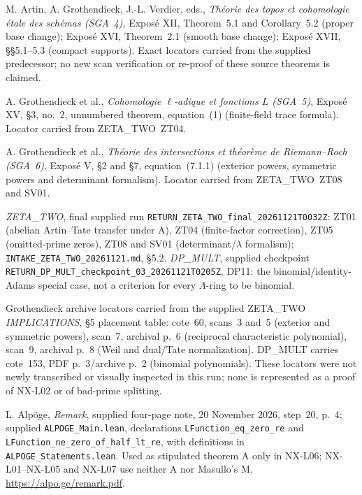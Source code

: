  M. Artin, A. Grothendieck, J.-L. Verdier, eds.,
\emph{Th\'eorie des topos et cohomologie \'etale des sch\'emas (SGA~4)},
Expos\'e XII, Theorem~5.1 and Corollary~5.2 (proper base change);
Expos\'e XVI, Theorem~2.1 (smooth base change);
Expos\'e XVII, \S\S5.1--5.3 (compact supports).
Exact locators carried from the supplied predecessor; no new scan
verification or re-proof of these source theorems is claimed.

 A. Grothendieck et al.,
\emph{Cohomologie $\ell$-adique et fonctions $L$ (SGA~5)},
Expos\'e XV, \S3, no.~2, unnumbered theorem, equation~(1)
(finite-field trace formula). Locator carried from ZETA\_TWO~ZT04.

 A. Grothendieck et al.,
\emph{Th\'eorie des intersections et th\'eor\`eme de Riemann--Roch (SGA~6)},
Expos\'e V, \S2 and \S7, equation~(7.1.1)
(exterior powers, symmetric powers and determinant formalism).
Locator carried from ZETA\_TWO~ZT08 and SV01.

 \emph{ZETA\_TWO}, final supplied run
\texttt{RETURN\_ZETA\_TWO\_final\_20261121T0032Z}:
ZT01 (abelian Artin--Tate transfer under A), ZT04 (finite-factor correction),
ZT05 (omitted-prime zeros), ZT08 and SV01 (determinant/$\lambda$ formalism);
\texttt{INTAKE\_ZETA\_TWO\_20261121.md}, \S5.2.
\emph{DP\_MULT}, supplied checkpoint
\texttt{RETURN\_DP\_MULT\_checkpoint\_03\_20261121T0205Z}, DP11:
the binomial/identity-Adams special case, not a criterion for every
$\Lambda$-ring to be binomial.

 Grothendieck archive locators carried from the supplied
ZETA\_TWO \emph{IMPLICATIONS}, \S5 placement table: cote~60,
scans~3 and~5 (exterior and symmetric powers), scan~7, archival p.~6
(reciprocal characteristic polynomial), scan~9, archival p.~8
(Weil and dual/Tate normalization). DP\_MULT carries cote~153,
PDF p.~3/archive p.~2 (binomial polynomials). These locators were not
newly transcribed or visually inspected in this run; none is represented
as a proof of NX-L02 or of bad-prime splitting.

 L. Alp\"oge, \emph{Remark}, supplied four-page note,
20 November 2026, step~20, p.~4; supplied
\texttt{ALPOGE\_Main.lean}, declarations
\texttt{LFunction\_eq\_zero\_re} and
\texttt{LFunction\_ne\_zero\_of\_half\_lt\_re}, with definitions in
\texttt{ALPOGE\_Statements.lean}. Used as stipulated theorem A only
in NX-L06; NX-L01--NX-L05 and NX-L07 use neither A nor Masullo's M.
\url{https://alpo.ge/remark.pdf}.
